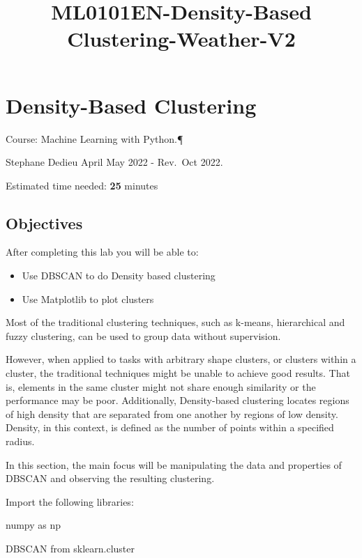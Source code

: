 \documentclass[11pt]{article}
\title{ML0101EN-Density-Based Clustering-Weather-V2}
\providecommand{\tightlist}{%
      \setlength{\itemsep}{0pt}\setlength{\parskip}{0pt}}
\begin{document}
    
    \maketitle
    
    

    
    \hypertarget{density-based-clustering}{%
\section{Density-Based Clustering}\label{density-based-clustering}}

Course: Machine Learning with Python.¶

Stephane Dedieu April May 2022 - Rev.~Oct 2022.

Estimated time needed: \textbf{25} minutes

\hypertarget{objectives}{%
\subsection{Objectives}\label{objectives}}

After completing this lab you will be able to:

\begin{itemize}
\tightlist
\item
  Use DBSCAN to do Density based clustering
\item
  Use Matplotlib to plot clusters
\end{itemize}

    Most of the traditional clustering techniques, such as k-means,
hierarchical and fuzzy clustering, can be used to group data without
supervision.

However, when applied to tasks with arbitrary shape clusters, or
clusters within a cluster, the traditional techniques might be unable to
achieve good results. That is, elements in the same cluster might not
share enough similarity or the performance may be poor. Additionally,
Density-based clustering locates regions of high density that are
separated from one another by regions of low density. Density, in this
context, is defined as the number of points within a specified radius.

In this section, the main focus will be manipulating the data and
properties of DBSCAN and observing the resulting clustering.

    Import the following libraries:

numpy as np

DBSCAN from sklearn.cluster
\end{document}
